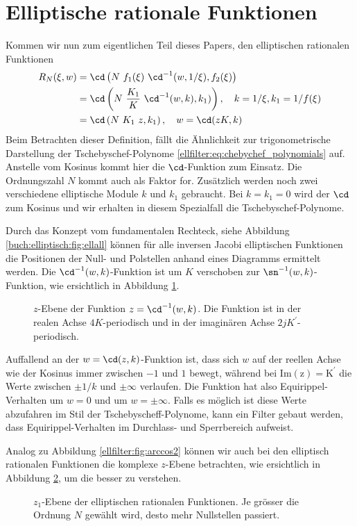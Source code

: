 \section{Elliptische rationale Funktionen}

Kommen wir nun zum eigentlichen Teil dieses Papers, den elliptischen rationalen Funktionen
\begin{align}
    R_N(\xi, w) &= \cd \left(N~f_1(\xi)~\cd^{-1}(w, 1/\xi), f_2(\xi)\right) \\
                &= \cd \left(N~\frac{K_1}{K}~\cd^{-1}(w, k), k_1)\right) , \quad k= 1/\xi, k_1 = 1/f(\xi) \\
                &= \cd \left(N~K_1~z , k_1 \right), \quad w= \cd(z K, k)
\end{align}
Beim Betrachten dieser Definition, fällt die Ähnlichkeit zur trigonometrische Darstellung der Tschebyschef-Polynome \eqref{ellfilter:eq:chebychef_polynomials} auf.
Anstelle vom Kosinus kommt hier die $\cd$-Funktion zum Einsatz.
Die Ordnungszahl $N$ kommt auch als Faktor for.
Zusätzlich werden noch zwei verschiedene elliptische Module $k$ und $k_1$ gebraucht.
Bei $k = k_1 = 0$ wird der $\cd$ zum Kosinus und wir erhalten in diesem Spezialfall die Tschebyschef-Polynome.

Durch das Konzept vom fundamentalen Rechteck, siehe Abbildung \ref{buch:elliptisch:fig:ellall} können für alle inversen Jacobi elliptischen Funktionen die Positionen der Null- und Polstellen anhand eines Diagramms ermittelt werden.
Die $\cd^{-1}(w, k)$-Funktion ist um $K$ verschoben zur $\sn^{-1}(w, k)$-Funktion, wie ersichtlich in Abbildung \ref{ellfilter:fig:cd}.
\begin{figure}
    \centering
    
    \caption{
        $z$-Ebene der Funktion $z = \cd^{-1}(w, k)$.
        Die Funktion ist in der realen Achse $4K$-periodisch und in der imaginären Achse $2jK^\prime$-periodisch.
    }
    \label{ellfilter:fig:cd}
\end{figure}
Auffallend an der $w = \cd(z, k)$-Funktion ist, dass sich $w$ auf der reellen Achse wie der Kosinus immer zwischen $-1$ und $1$ bewegt, während bei $\mathrm{Im(z) = K^\prime}$ die Werte zwischen $\pm 1/k$ und $\pm \infty$ verlaufen.
Die Funktion hat also Equirippel-Verhalten um $w=0$ und um $w=\pm \infty$. %
Falls es möglich ist diese Werte abzufahren im Stil der Tschebyscheff-Polynome, kann ein Filter gebaut werden, dass Equirippel-Verhalten im Durchlass- und Sperrbereich aufweist.

Analog zu Abbildung \ref{ellfilter:fig:arccos2} können wir auch bei den elliptisch rationalen Funktionen die komplexe $z$-Ebene betrachten, wie ersichtlich in Abbildung \ref{ellfilter:fig:cd2}, um die besser zu verstehen.
\begin{figure}
    \centering
    
    \caption{
        $z_1$-Ebene der elliptischen rationalen Funktionen.
        Je grösser die Ordnung $N$ gewählt wird, desto mehr Nullstellen passiert.
    }
    \label{ellfilter:fig:cd2}
\end{figure}

